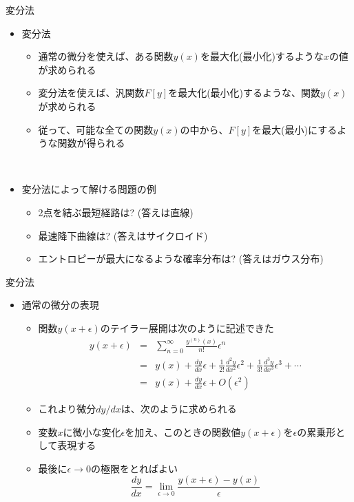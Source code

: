 \documentclass[dvipdfmx,notheorems,t]{beamer}
\begin{document}
\begin{frame}{変分法}

\begin{itemize}
	\item 変分法
	\begin{itemize}
		\item 通常の微分を使えば、ある関数$y(x)$を最大化(最小化)するような$x$の値が求められる
		\newline
		\item \alert{変分法}を使えば、汎関数$F[y]$を最大化(最小化)するような、関数$y(x)$が求められる
		\item 従って、可能な全ての関数$y(x)$の中から、$F[y]$を最大(最小)にするような関数が得られる
	\end{itemize} \
	
	\item 変分法によって解ける問題の例
	\begin{itemize}
		\item 2点を結ぶ最短経路は? (答えは直線)
		\item 最速降下曲線は? (答えはサイクロイド)
		\item \alert{エントロピーが最大}になるような確率分布は? (答えは\alert{ガウス分布})
	\end{itemize}
\end{itemize}

\end{frame}

\begin{frame}{変分法}

\begin{itemize}
	\item 通常の微分の表現
	\begin{itemize}
		\item 関数$y(x + \epsilon)$のテイラー展開は次のように記述できた
		\begin{eqnarray}
			y(x + \epsilon) &=& \sum_{n = 0}^\infty \frac{y^{(n)}(x)}{n!} \epsilon^n \\
			&=& y(x) + \frac{dy}{dx} \epsilon + \frac{1}{2!} \frac{d^2 y}{dx^2} \epsilon^2 + \frac{1}{3!} \frac{d^3 y}{dx^3} \epsilon^3 + \cdots \\
			&=& y(x) + \frac{dy}{dx} \epsilon + O(\epsilon^2)
		\end{eqnarray}
		
		\item これより微分$dy / dx$は、次のように求められる
		\item 変数$x$に微小な変化$\epsilon$を加え、このときの関数値$y(x + \epsilon)$を$\epsilon$の累乗形として表現する
		\item 最後に$\epsilon \to 0$の極限をとればよい
		\begin{equation}
			\frac{dy}{dx} = \lim_{\epsilon \to 0} \frac{y(x + \epsilon) - y(x)}{\epsilon}
		\end{equation}
	\end{itemize}
\end{itemize}

\end{frame}
\end{document}
